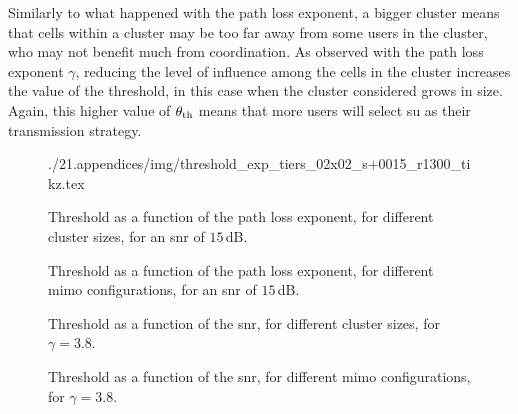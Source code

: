 Similarly to what happened with the path loss exponent, a bigger cluster means
that cells within a cluster may be too far away from some users in the cluster,
who may not benefit much from coordination. As observed with the path loss
exponent $\gamma$, reducing the level of influence among the cells in the
cluster increases the value of the threshold, in this case when the cluster
considered grows in size. Again, this higher value of $\theta_{\text{th}}$ means that more
users will select \gls{su} as their transmission strategy.

\begin{figure}[t]
	\centering
     {./21.appendices/img/threshold_exp_tiers_02x02_s+0015_r1300_tikz.tex}
    \restoregeometry
	\caption{Threshold as a function of the path loss exponent, for different
    cluster sizes, for an \gls{snr} of $15$\,dB.}
	\label{fig:th_exp_tiers}
\end{figure}

\begin{figure}[t]
	\centering
    
    \restoregeometry
	\caption{Threshold as a function of the path loss exponent, for different
    \gls{mimo} configurations, for an \gls{snr} of $15$\,dB.}
	\label{fig:th_exp_ant}
\end{figure}

\begin{figure}[t]
	\centering
    
    \restoregeometry
    \caption{Threshold as a function of the \gls{snr}, for different cluster
    sizes, for $\gamma = 3.8$.}
	\label{fig:th_snr_tiers}
\end{figure}

\begin{figure}[t]
	\centering
    
    \restoregeometry
    \caption{Threshold as a function of the \gls{snr}, for different \gls{mimo}
    configurations, for $\gamma = 3.8$.}
	\label{fig:th_snr_ant}
\end{figure}
